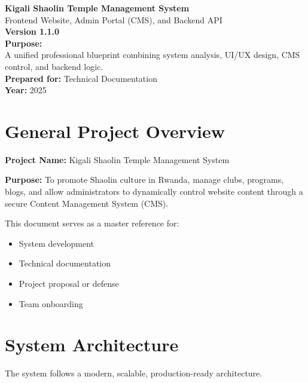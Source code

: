 \documentclass[12pt,a4paper]{article}
\begin{document}
\begin{titlepage}
    \centering
    \vspace*{2cm}
    {\Huge \textbf{Kigali Shaolin Temple Management System}}\\[0.5cm]
    {\Large Frontend Website, Admin Portal (CMS), and Backend API}\\[0.3cm]
    {\large \textbf{Version 1.1.0}}\\[1.5cm]
    
    \textbf{Purpose:}\\
    A unified professional blueprint combining system analysis, UI/UX design,
    CMS control, and backend logic.\\[1.5cm]
    
    \vfill
    {\large \textbf{Prepared for:} Technical Documentation}\\
    {\large \textbf{Year:} 2025}
\end{titlepage}

\tableofcontents
\newpage

\section{General Project Overview}

\textbf{Project Name:} Kigali Shaolin Temple Management System

\textbf{Purpose:}  
To promote Shaolin culture in Rwanda, manage clubs, programs, blogs, and allow administrators
to dynamically control website content through a secure Content Management System (CMS).

This document serves as a master reference for:
\begin{itemize}
    \item System development
    \item Technical documentation
    \item Project proposal or defense
    \item Team onboarding
\end{itemize}

\section{System Architecture}

The system follows a modern, scalable, production-ready architecture.
\end{document}

